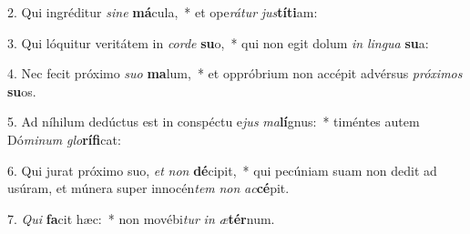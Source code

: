 2. Qui ingréditur \textit{si}\textit{ne} \textbf{má}cula,~*  et ope\textit{rá}\textit{tur} \textit{jus}\textbf{tí}\textbf{ti}am:\

3. Qui lóquitur veritátem in \textit{cor}\textit{de} \textbf{su}o,~*  qui non egit dolum \textit{in} \textit{lin}\textit{gua} \textbf{su}a:\

4. Nec fecit próximo \textit{su}\textit{o} \textbf{ma}lum,~*  et oppróbrium non accépit advérsus \textit{pró}\textit{xi}\textit{mos} \textbf{su}os.\

5. Ad níhilum dedúctus est in conspéctu e\textit{jus} \textit{ma}\textbf{lí}gnus:~*  timéntes autem Dó\textit{mi}\textit{num} \textit{glo}\textbf{rí}\textbf{fi}cat:\

6. Qui jurat próximo suo, \textit{et} \textit{non} \textbf{dé}cipit,~*  qui pecúniam suam non dedit ad usúram, et múnera super innocén\textit{tem} \textit{non} \textit{ac}\textbf{cé}pit.\

7. \textit{Qui} \textbf{fa}cit hæc:~*  non movébi\textit{tur} \textit{in} \textit{æ}\textbf{tér}num.\

